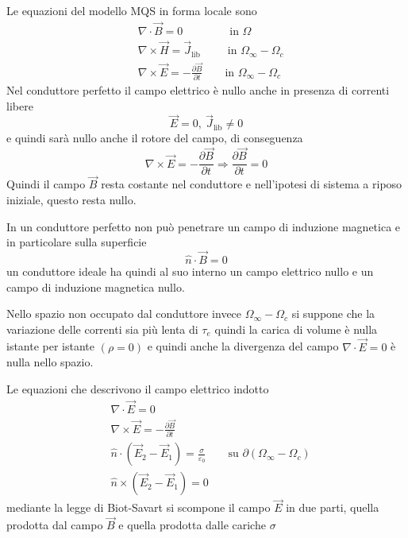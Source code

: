 Le equazioni del modello MQS in forma locale sono
$$
\begin{aligned}
&\nabla\cdot\vec{B} = 0\qquad\qquad\ \text{in }\Omega\\
&\nabla\times\vec{H} = \vec{J}_\text{lib} \qquad\ \  \text{in } \Omega_\infty-\Omega_c\\
&\nabla\times\vec{E} = -\frac{\partial\vec{B}}{\partial t} \qquad \text{in } \Omega_\infty-\Omega_c
\end{aligned}
$$
Nel conduttore perfetto il campo elettrico è nullo anche in presenza di correnti 
libere
$$
\vec{E}=0,\ \vec{J}_\text{lib} \neq 0
$$
e quindi sarà nullo anche il rotore del campo, di conseguenza
$$
\nabla\times\vec{E} = -\frac{\partial\vec{B}}{\partial t} \Rightarrow \frac{\partial\vec{B}}{\partial t} = 0
$$
Quindi il campo $\vec{B}$ resta costante nel conduttore e nell'ipotesi di sistema a riposo 
iniziale, questo resta nullo.

In un conduttore perfetto non può penetrare un campo di induzione magnetica e in 
particolare sulla superficie
$$
\hat{n}\cdot\vec{B} = 0
$$
un conduttore ideale ha quindi al suo interno un campo elettrico nullo e un campo
di induzione magnetica nullo.

Nello spazio non occupato dal conduttore invece $\Omega_\infty-\Omega_c$ si suppone
che la variazione delle correnti sia più lenta di $\tau_e$ quindi la carica di volume 
è nulla istante per istante $(\rho = 0 )$ e quindi anche la divergenza del campo $\nabla\cdot\vec{E} = 0$
è nulla nello spazio.

Le equazioni che descrivono il campo elettrico indotto
$$
\begin{aligned}
&\nabla\cdot\vec{E} = 0\\
&\nabla\times\vec{E} = -\frac{\partial\vec{B}}{\partial t}\\
&\hat{n}\cdot\left(\vec{E}_2-\vec{E}_1\right) = \frac{\sigma}{\varepsilon_0} \qquad \text{su }\partial(\Omega_\infty-\Omega_c) \\
& \hat{n}\times\left(\vec{E}_2-\vec{E}_1\right) = 0
\end{aligned}
$$
mediante la legge di Biot-Savart si scompone il campo $\vec{E}$ in due parti, quella prodotta
dal campo $\vec{B}$ e quella prodotta dalle cariche $\sigma$

